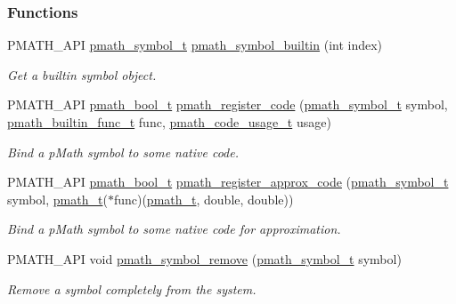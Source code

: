 \subsubsection*{Functions}
\begin{CompactItemize}
\item 
PMATH\_\-API \hyperlink{classpmath__symbol__t}{pmath\_\-symbol\_\-t} \hyperlink{group__symbols_ge9a166b048d04e6ef25632127f0172ba}{pmath\_\-symbol\_\-builtin} (int index)
\begin{CompactList}\small\item\em Get a builtin symbol object. \item\end{CompactList}\item 
PMATH\_\-API \hyperlink{group__general__types_gc92090cb0b56345d6c379ed2341d4ef4}{pmath\_\-bool\_\-t} \hyperlink{group__symbols_gd02a05fa96992d137b450627486ec0b5}{pmath\_\-register\_\-code} (\hyperlink{classpmath__symbol__t}{pmath\_\-symbol\_\-t} symbol, \hyperlink{group__symbols_g4a74d7aeade34fc26c04ffde22ab1a1a}{pmath\_\-builtin\_\-func\_\-t} func, \hyperlink{group__symbols_g957dfb51b09e821a8fc052835ea66670}{pmath\_\-code\_\-usage\_\-t} usage)
\begin{CompactList}\small\item\em Bind a pMath symbol to some native code. \item\end{CompactList}\item 
PMATH\_\-API \hyperlink{group__general__types_gc92090cb0b56345d6c379ed2341d4ef4}{pmath\_\-bool\_\-t} \hyperlink{group__symbols_gfb4f09c196d889a710c73d917ea0c12a}{pmath\_\-register\_\-approx\_\-code} (\hyperlink{classpmath__symbol__t}{pmath\_\-symbol\_\-t} symbol, \hyperlink{classpmath__t}{pmath\_\-t}($\ast$func)(\hyperlink{classpmath__t}{pmath\_\-t}, double, double))
\begin{CompactList}\small\item\em Bind a pMath symbol to some native code for approximation. \item\end{CompactList}\item 
PMATH\_\-API void \hyperlink{group__symbols_g78e6e98a2973c5e2b073b885269b12e4}{pmath\_\-symbol\_\-remove} (\hyperlink{classpmath__symbol__t}{pmath\_\-symbol\_\-t} symbol)
\begin{CompactList}\small\item\em Remove a symbol completely from the system. \item\end{CompactList}\item 

\end{CompactItemize}
